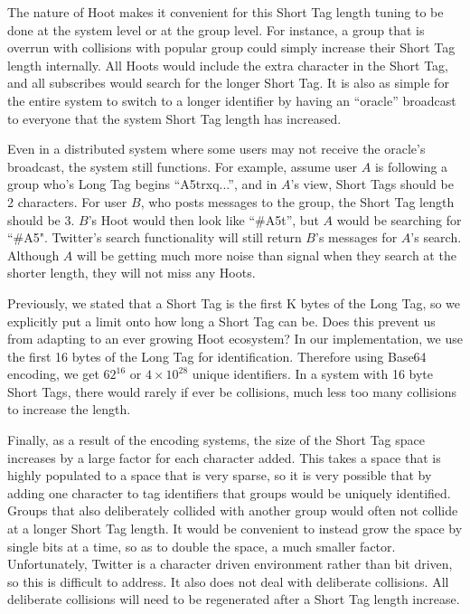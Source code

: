 The nature of Hoot makes it convenient for this Short Tag length tuning to be done at the system level or at the group level. For instance, a group that is overrun with collisions with popular group could simply increase their Short Tag length internally. All Hoots would include the extra character in the Short Tag, and all subscribes would search for the longer Short Tag. It is also as simple for the entire system to switch to a longer identifier by having an ``oracle'' broadcast to everyone that the system Short Tag length has increased.

Even in a distributed system where some users may not receive the oracle's broadcast, the system still functions. For example, assume user $A$ is following a group who's Long Tag begins ``A5trxq...'', and in $A$'s view, Short Tags should be 2 characters. For user $B$, who posts messages to the group, the Short Tag length should be 3. $B$'s Hoot would then look like ``\#A5t'', but $A$ would be searching for ``\#A5". Twitter's search functionality will still return $B$'s messages for $A$'s search. Although $A$ will be getting much more noise than signal when they search at the shorter length, they will not miss any Hoots.

Previously, we stated that a Short Tag is the first K bytes of the Long Tag, so we explicitly put a limit onto how long a Short Tag can be. Does this prevent us from adapting to an ever growing Hoot ecosystem? In our implementation, we use the first 16 bytes of the Long Tag for identification. Therefore using Base64 encoding, we get $62^{16}$ or $4\times10^{28}$ unique identifiers. In a system with 16 byte Short Tags, there would rarely if ever be collisions, much less too many collisions to increase the length.

Finally, as a result of the encoding systems, the size of the Short Tag space increases by a large factor for each character added. This takes a space that is highly populated to a space that is very sparse, so it is very possible that by adding one character to tag identifiers that groups would be uniquely identified. Groups that also deliberately collided with another group would often not collide at a longer Short Tag length. It would be convenient to instead grow the space by single bits at a time, so as to double the space, a much smaller factor. Unfortunately, Twitter is a character driven environment rather than bit driven, so this is difficult to address. It also does not deal with deliberate collisions. All deliberate collisions will need to be regenerated after a Short Tag length increase.


